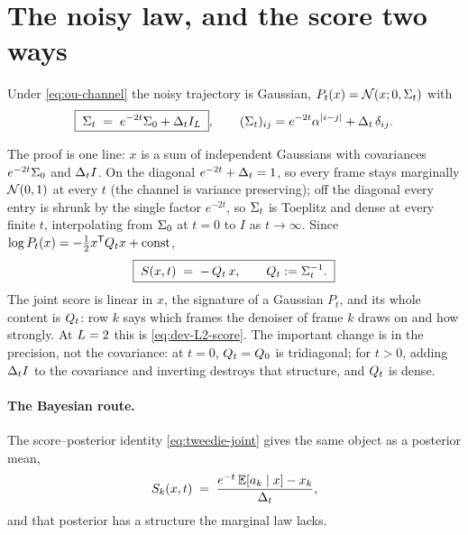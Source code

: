\section{The noisy law, and the score two ways}
\label{sec:g-noisy}\label{sec:g-score}

\begin{proposition}\label{prop:g-Sigt}
Under \eqref{eq:ou-channel} the noisy trajectory is Gaussian,
$P_t(x) = \mathcal{N}(x; 0, \Sigma_t)$ with
\begin{equation}
  \boxed{\;\Sigma_t \;=\; e^{-2t}\Sigma_0 + \Delta_t I_{L}\;},
  \qquad
  (\Sigma_t)_{ij} = e^{-2t}\alpha^{|i-j|} + \Delta_t\,\delta_{ij} .
  \label{eq:g-Sigt}
\end{equation}
\end{proposition}

\noindent The proof is one line: $x$ is a sum of independent Gaussians with
covariances $e^{-2t}\Sigma_0$ and $\Delta_t I$. On the diagonal
$e^{-2t} + \Delta_t = 1$, so every frame stays marginally $\mathcal{N}(0,1)$ at every
$t$ (the channel is variance preserving); off the diagonal every entry is
shrunk by the single factor $e^{-2t}$, so $\Sigma_t$ is Toeplitz and dense at
every finite $t$, interpolating from $\Sigma_0$ at $t=0$ to $I$ as
$t \to \infty$. Since $\log P_t(x) = -\tfrac12 x^{\mathsf{T}} Q_t x + \mathrm{const}$,
\begin{equation}
  \boxed{\;S(x, t) \;=\; -\,Q_t\, x,
  \qquad Q_t := \Sigma_t^{-1}.\;}
  \label{eq:g-score-matrix}
\end{equation}
The joint score is linear in $x$, the signature of a Gaussian $P_t$, and its
whole content is $Q_t$: row $k$ says which frames the denoiser of frame $k$
draws on and how strongly. At $L = 2$ this is \eqref{eq:dev-L2-score}.
The important change is in the precision, not the covariance: at $t = 0$,
$Q_t = Q_0$ is tridiagonal; for $t > 0$, adding $\Delta_t I$ to the covariance
and inverting destroys that structure, and $Q_t$ is dense.

\paragraph{The Bayesian route.} The score--posterior identity
\eqref{eq:tweedie-joint} gives the same object as a posterior mean,
\begin{equation}
  S_k(x,t) \;=\; \frac{e^{-t}\,\mathbb{E}[a_k\mid x]-x_k}{\Delta_t} ,
  \label{eq:g-tweedie}
\end{equation}
and that posterior has a structure the marginal law lacks.

